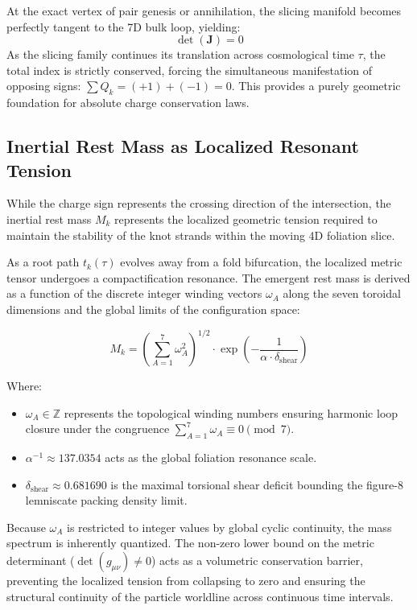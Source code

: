 At the exact vertex of pair genesis or annihilation, the slicing manifold becomes perfectly tangent to the 7D bulk loop, yielding:
\begin{equation}
    \det(\mathbf{J}) = 0
\end{equation}
As the slicing family continues its translation across cosmological time $\tau$, the total index is strictly conserved, forcing the simultaneous manifestation of opposing signs: $\sum Q_k = (+1) + (-1) = 0$. This provides a purely geometric foundation for absolute charge conservation laws.

\subsection{Inertial Rest Mass as Localized Resonant Tension}
\label{subsec:mass_tension}

While the charge sign represents the crossing direction of the intersection, the inertial rest mass $M_k$ represents the localized geometric tension required to maintain the stability of the knot strands within the moving 4D foliation slice. 

As a root path $t_k(\tau)$ evolves away from a fold bifurcation, the localized metric tensor undergoes a compactification resonance. The emergent rest mass is derived as a function of the discrete integer winding vectors $\omega_A$ along the seven toroidal dimensions and the global limits of the configuration space:

\begin{equation}
    M_k = \left( \sum_{A=1}^{7} \omega_A^2 \right)^{1/2} \cdot \exp\left( -\frac{1}{\alpha \cdot \delta_{\text{shear}}} \right)
\end{equation}

Where:
\begin{itemize}
    \item $\omega_A \in \mathbb{Z}$ represents the topological winding numbers ensuring harmonic loop closure under the congruence $\sum_{A=1}^7 \omega_A \equiv 0 \pmod 7$.
    \item \hfill \break $\alpha^{-1} \approx 137.0354$ acts as the global foliation resonance scale.
    \item $\delta_{\text{shear}} \approx 0.681690$ is the maximal torsional shear deficit bounding the figure-8 lemniscate packing density limit.
\end{itemize}

Because $\omega_A$ is restricted to integer values by global cyclic continuity, the mass spectrum is inherently quantized. The non-zero lower bound on the metric determinant ($\det(g_{\mu\nu}) \neq 0$) acts as a volumetric conservation barrier, preventing the localized tension from collapsing to zero and ensuring the structural continuity of the particle worldline across continuous time intervals.
